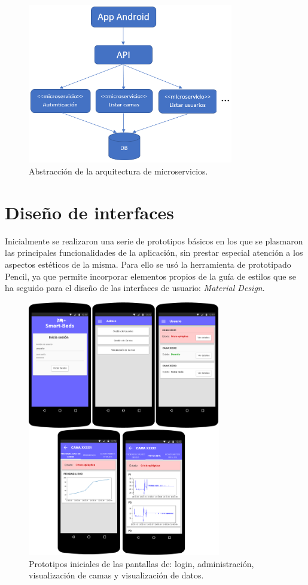 \begin{figure}[H]
	\centering
	\includegraphics[width=0.8\textwidth]{../img/microservicios.png}
	\caption{Abstracción de la arquitectura de microservicios.}
	\label{fig:microservicios}
\end{figure}

\section{Diseño de interfaces}

Inicialmente se realizaron una serie de prototipos básicos en los que se plasmaron las principales funcionalidades de la aplicación, sin prestar especial atención a los aspectos estéticos de la misma. Para ello se usó la herramienta de prototipado Pencil, ya que permite incorporar elementos propios de la guía de estilos que se ha seguido para el diseño de las interfaces de usuario: \textit{Material Design}. 

\begin{figure}[H]
	\centering
	\includegraphics[width=0.75\textwidth]{../img/prototipos.png}
	\caption{Prototipos iniciales de las pantallas de: login, administración, visualización de camas y visualización de datos.}
	\label{fig:prototipos}
\end{figure}

